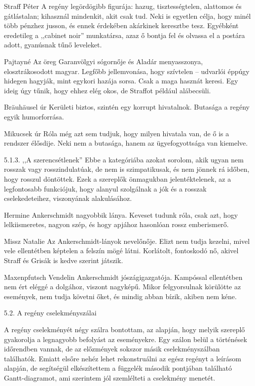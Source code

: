 \documentclass[a4paper,12pt]{thesis-ekf}
\begin{document}
    Straff Péter
    A regény legördögibb figurája: hazug, tisztességtelen, alattomos és gátlástalan; kihasznál mindenkit, akit csak tud. Neki is egyetlen célja, hogy minél több pénzhez jusson, és ennek érdekében akárkinek keresztbe tesz. Egyébként eredetileg a ,,cabinet noir'' munkatársa, azaz ő bontja fel és olvassa el a postára adott, gyanúsnak tűnő leveleket.

    Pajtayné
    Az öreg Garanvölgyi sógornője és Aladár menyasszonya, elosztrákosodott magyar. Legfőbb jellemvonása, hogy szívtelen – udvarlói éppúgy hidegen hagyják, mint egykori hazája sorsa. Csak a maga hasznát keresi. Egy ideig úgy tűnik, hogy ehhez elég okos, de Straffot például alábecsüli.

    Bräuhäusel úr
    Kerületi biztos, szintén egy korrupt hivatalnok. Butasága a regény egyik humorforrása.

    Mikucsek úr
    Róla még azt sem tudjuk, hogy milyen hivatala van, de ő is a rendszer élősdije. Neki nem a butasága, hanem az ügyefogyottsága van kiemelve.

    5.1.3. ,,A szerencsétlenek''
    Ebbe a kategóriába azokat sorolom, akik ugyan nem rosszak vagy rosszindulatúak, de nem is szimpatikusak, és nem jönnek rá időben, hogy rosszul döntöttek. Ezek a szereplők önmagukban jelentéktelenek, az a legfontosabb funkciójuk, hogy alanyul szolgálnak a jók és a rosszak cselekedeteihez, viszonyának alakulásához.

    Hermine
    Ankerschmidt nagyobbik lánya. Keveset tudunk róla, csak azt, hogy lelkiismeretes, nagyon szép, és hogy apjához hasonlóan rossz emberismerő.

    Missz Natalie
    Az Ankerschmidt-lányok nevelőnője. Elizt nem tudja kezelni, mivel vele ellentétben képtelen a felszín mögé látni. Korlátolt, fontoskodó nő, akivel Straff és Grisák is kedve szerint játszik.

    Maxenpfutsch Vendelin
    Ankerschmidt jószágigazgatója. Kampóssal ellentétben nem ért eléggé a dolgához, viszont nagyképű. Mikor felgyorsulnak körülötte az események, nem tudja követni őket, és mindig abban bízik, akiben nem kéne.

    5.2. A regény cselekményszálai

    A regény cselekményét négy szálra bontottam, az alapján, hogy melyik szereplő gyakorolja a legnagyobb befolyást az eseményekre. Egy szálon belül a történések időrendben vannak, de az előzmények sokszor másik cselekményszálban találhatók. Emiatt elsőre nehéz lehet rekonstruálni az egész regényt a leírásom alapján, de segítségül elkészítettem a függelék második pontjában található Gantt-diagramot, ami szerintem jól szemlélteti a cselekmény menetét.
\end{document}

